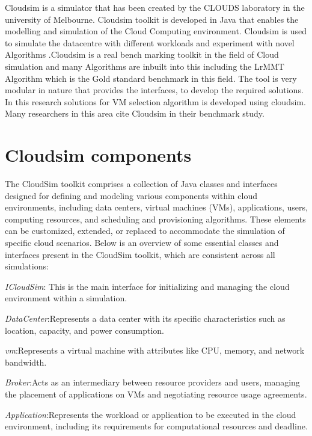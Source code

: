 \documentclass[a4paper,12pt]{Classes/RoboticsLaTeX}
\begin{document}
        Cloudsim \cite{calheiros2011cloudsim} is a simulator that has been created by the CLOUDS laboratory in the university of Melbourne. Cloudsim toolkit is developed in Java that enables the modelling and simulation of the Cloud Computing environment. Cloudsim is used  to simulate the datacentre with different workloads and experiment with novel Algorithms .Cloudsim is a real bench marking toolkit in the field of Cloud simulation and many Algorithms are inbuilt into this including the LrMMT Algorithm which is the Gold standard benchmark  in this field.
        The tool is very modular in nature that provides the interfaces, to develop the required solutions. In this research solutions for VM selection algorithm is developed using cloudsim. Many researchers in this area cite Cloudsim in their benchmark study.

        \section{Cloudsim components}

        The CloudSim toolkit comprises a collection of Java classes and interfaces designed for defining and modeling various components within cloud environments, including data centers, virtual machines (VMs), applications, users, computing resources, and scheduling and provisioning algorithms. These elements can be customized, extended, or replaced to accommodate the simulation of specific cloud scenarios.\cite{calheiros2011cloudsim} Below is an overview of some essential classes and interfaces present in the CloudSim toolkit, which are consistent across all simulations:

        \textit{ICloudSim}: This is the main interface for initializing and managing the cloud environment within a simulation.

        \textit{DataCenter}:Represents a data center with its specific characteristics such as location, capacity, and power consumption.

        \textit{vm}:Represents a virtual machine with attributes like CPU, memory, and network bandwidth.

        \textit{Broker}:Acts as an intermediary between resource providers and users, managing the placement of applications on VMs and negotiating resource usage agreements.

        \textit{Application}:Represents the workload or application to be executed in the cloud environment, including its requirements for computational resources and deadline.
\end{document}
